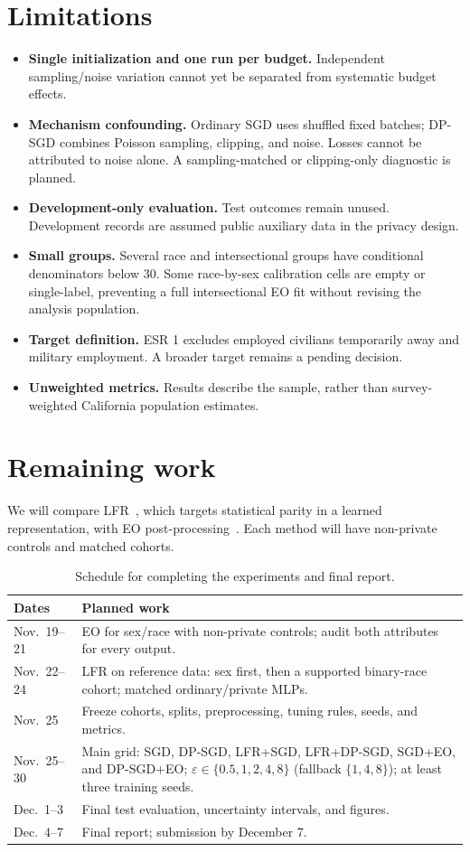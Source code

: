 \documentclass[11pt,letterpaper]{article}
\newcommand{\eps}{\varepsilon}
\begin{document}
\section{Limitations}
\begin{itemize}
\item \textbf{Single initialization and one run per budget.} Independent sampling/noise variation cannot yet be separated from systematic budget effects.
\item \textbf{Mechanism confounding.} Ordinary SGD uses shuffled fixed batches; DP-SGD combines Poisson sampling, clipping, and noise. Losses cannot be attributed to noise alone. A sampling-matched or clipping-only diagnostic is planned.
\item \textbf{Development-only evaluation.} Test outcomes remain unused. Development records are assumed public auxiliary data in the privacy design.
\item \textbf{Small groups.} Several race and intersectional groups have conditional denominators below 30. Some race-by-sex calibration cells are empty or single-label, preventing a full intersectional EO fit without revising the analysis population.
\item \textbf{Target definition.} ESR 1 excludes employed civilians temporarily away and military employment. A broader target remains a pending decision.
\item \textbf{Unweighted metrics.} Results describe the sample, rather than survey-weighted California population estimates.
\end{itemize}

\section{Remaining work}
We will compare LFR~\cite{zemel2013}, which targets statistical parity in a learned representation, with EO post-processing~\cite{hardt2016}. Each method will have non-private controls and matched cohorts.
\begin{table}[H]
\centering\small
\begin{tabularx}{\linewidth}{lX}\toprule
Dates & Planned work\\\midrule
Nov.\ 19--21 & EO for sex/race with non-private controls; audit both attributes for every output.\\
Nov.\ 22--24 & LFR on reference data: sex first, then a supported binary-race cohort; matched ordinary/private MLPs.\\
Nov.\ 25 & Freeze cohorts, splits, preprocessing, tuning rules, seeds, and metrics.\\
Nov.\ 25--30 & Main grid: SGD, DP-SGD, LFR+SGD, LFR+DP-SGD, SGD+EO, and DP-SGD+EO; $\eps\in\{0.5,1,2,4,8\}$ (fallback $\{1,4,8\}$); at least three training seeds.\\
Dec.\ 1--3 & Final test evaluation, uncertainty intervals, and figures.\\
Dec.\ 4--7 & Final report; submission by December 7.\\\bottomrule
\end{tabularx}
\caption{Schedule for completing the experiments and final report.}\label{tab:timeline}
\end{table}
\end{document}
